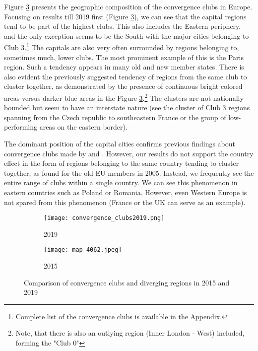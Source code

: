 \documentclass[11pt]{article}
\begin{document}
Figure \ref{clubs_graphic} presents the geographic composition of the convergence clubs in Europe. Focusing on results till 2019 first (Figure \ref{clubs_graphic}), we can see that the capital regions tend to be part of the highest clubs. This also includes the Eastern periphery, and the only exception seems to be the South with the major cities belonging to Club 3.\footnote{Complete list of the convergence clubs is available in the Appendix.} The capitals are also very often surrounded by regions belonging to, sometimes much, lower clubs. The most prominent example of this is the Paris region. Such a tendency appears in many old and new member states. There is also evident the previously suggested tendency of regions from the same club to cluster together, as demonstrated by the presence of continuous bright colored areas versus darker blue areas in the Figure \ref{clubs_graphic}.\footnote{Note, that there is also an outlying region (Inner London - West) included, forming the "Club 0"} The clusters are not nationally bounded but seem to have an interstate nature (see the cluster of Club 3 regions spanning from the Czech republic to southeastern France or the group of low-performing areas on the eastern border).


The dominant position of the capital cities confirms previous findings about convergence clubs made by \citet{sme2012regional} and \citet{bartkowska2012regional}. However, our results do not support the country effect in the form of regions belonging to the same country tending to cluster together, as \citet{bartkowska2012regional} found for the old EU members in 2005. Instead, we frequently see the entire range of clubs within a single country. We can see this phenomenon in eastern countries such as Poland or Romania. However,
even Western Europe is not spared from this phenomenon (France or the UK can serve as an example).


\begin{figure}[!htbp]%
\centering
\begin{subfigure}[c]{0.75\linewidth}
  {
  \texttt{[image: convergence\_clubs2019.png]}
    \caption{2019}
    \label{clubs_graphic_2019}
  }
\end{subfigure}
\qquad
\begin{subfigure}[c]{0.75\linewidth}
  \texttt{[image: map\_4062.jpeg]}
  \caption{2015}
  \label{clubs_graphic_2015}
\end{subfigure}
  \caption{Comparison of convergence clubs and diverging regions in 2015 and 2019}
\label{clubs_graphic}
\end{figure} 
\end{document}
